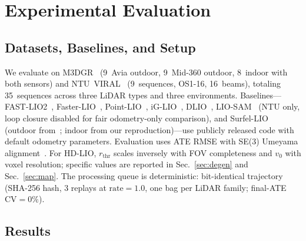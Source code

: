 \documentclass[conference]{IEEEtran}
\begin{document}
\section{Experimental Evaluation}\label{sec:exp}

\subsection{Datasets, Baselines, and Setup}

We evaluate on M3DGR~\cite{yin2024m3dgr} (9~Avia outdoor, 9~Mid-360
outdoor, 8~indoor with both sensors) and
NTU~VIRAL~\cite{nguyen2022ntuviral} (9~sequences, OS1-16, 16~beams),
totaling 35~sequences across three LiDAR types and three environments.
Baselines---FAST-LIO2~\cite{xu2022fastlio2},
Faster-LIO~\cite{bai2022fasterlio}, Point-LIO~\cite{he2023pointlio},
iG-LIO~\cite{chen2024iglio}, DLIO~\cite{chen2023dlio},
LIO-SAM~\cite{shan2020liosam} (NTU only, loop closure disabled for
fair odometry-only comparison), and
Surfel-LIO~\cite{lv2025surfellio} (outdoor from~\cite{lv2025surfellio};
indoor from our reproduction)---use publicly released code with
default odometry parameters. Evaluation uses ATE RMSE with SE(3)
Umeyama alignment~\cite{horn1987closedform,grupp2017evo}. For HD-LIO,
$r_\mathrm{thr}$ scales inversely with FOV completeness and $v_0$
with voxel resolution; specific values are reported in
Sec.~\ref{sec:degen} and Sec.~\ref{sec:map}. The processing queue is
deterministic: bit-identical trajectory (SHA-256 hash, 3 replays at
$\mathrm{rate}{=}1.0$, one bag per LiDAR family; final-ATE
$\mathrm{CV}{=}0\%$).

\subsection{Results}
\end{document}
